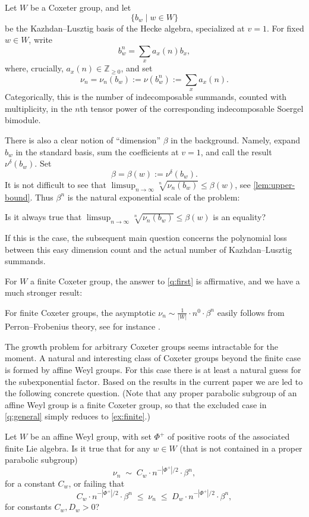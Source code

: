 \documentclass[a4paper,11pt]{amsart}
\newcommand{\N}{\mathbb{Z}_{\geq 0}}
\numberwithin{equation}{subsection}
\theoremstyle{definition}
\theoremstyle{remark}
\begin{document}
Let \(W\) be a Coxeter group, and let
\[
\{b_w\mid w\in W\}
\]
be the Kazhdan--Lusztig basis of the Hecke algebra, specialized at \(v=1\).
For fixed \(w\in W\), write
\[
b_w^n=\sum_x a_x(n)b_x,
\]
where, crucially, $a_x(n)\in\N$,
and set
\[
\nu_n=\nu_n(b_w):=\nu(b_w^n):=\sum_x a_x(n).
\]
Categorically, this is the number of indecomposable summands, counted with
multiplicity, in the \(n\)th tensor power of the corresponding
indecomposable Soergel bimodule.

There is also a clear notion of ``dimension'' $\beta$ in the background. Namely, expand
\(b_w\) in the standard basis, sum the coefficients at \(v=1\), and call the
result \(\nu^\delta(b_w)\). Set
\[
\beta=\beta(w):=\nu^\delta(b_w).
\]
It is not difficult to see that $\limsup_{n\to\infty}\sqrt[n]{\nu_n(b_w)}\le\beta(w)$, see \autoref{lem:upper-bound}.
Thus \(\beta^n\) is the natural exponential scale of the problem:

\begin{Question}\label{q:first}
Is it always true that $\limsup_{n\to\infty}\sqrt[n]{\nu_n(b_w)}\le\beta(w)$ is an equality?
\end{Question}

If this is the case, the subsequent main
question concerns the polynomial loss between this easy dimension count and the
actual number of Kazhdan--Lusztig summands.

For $W$ a finite Coxeter group, the answer to \autoref{q:first} is affirmative, and we have a much stronger result:

\begin{Example}\label{ex:finite}
For finite Coxeter groups, the asymptotic $\nu_n\sim \tfrac{1}{|W|}\cdot n^0 \cdot\beta^n$ easily follows from Perron--Frobenius theory, see for instance \cite{LaTuVa-growth-pfdim}.
\end{Example}

The growth problem for arbitrary Coxeter groups seems intractable for the moment. A natural and interesting class of Coxeter groups beyond the finite case is formed by affine Weyl groups. For this case there is at least a natural guess for the subexponential factor.
Based on the results in the current paper we are led to the following concrete question. (Note that any proper parabolic subgroup of an affine Weyl group is a finite Coxeter group, so that the excluded case in \autoref{q:general} simply reduces to \autoref{ex:finite}.)

\begin{Question}\label{q:general}
Let $W$ be an affine Weyl group, with set $\Phi^+$ of positive roots of the associated finite Lie algebra. Is it true that for any $w\in W$ (that is not contained in a proper parabolic subgroup)
\[\nu_n\;\sim\; C_w\cdot n^{-|\Phi^+|/2}\cdot \beta^n,\]
for a constant $C_w$, or failing that
\[ C_w\cdot n^{-|\Phi^+|/2}\cdot \beta^n\;\le\; \nu_n\;\le\; D_w\cdot n^{-|\Phi^+|/2}\cdot \beta^n,\]
for constants $C_w,D_w>0$?
\end{Question}
\end{document}
